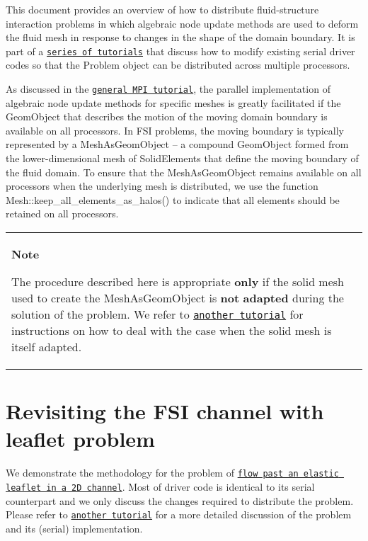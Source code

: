 This document provides an overview of how to distribute fluid-\/structure interaction problems in which algebraic node update methods are used to deform the fluid mesh in response to changes in the shape of the domain boundary. It is part of a \href{../../../example_code_list/html/index.html#distributed}{\tt series of tutorials} that discuss how to modify existing serial driver codes so that the {\ttfamily Problem} object can be distributed across multiple processors.

As discussed in the \href{../../general_mpi/html/index.html#alg_node_update}{\tt general M\+PI tutorial}, the parallel implementation of algebraic node update methods for specific meshes is greatly facilitated if the {\ttfamily Geom\+Object} that describes the motion of the moving domain boundary is available on all processors. In F\+SI problems, the moving boundary is typically represented by a {\ttfamily Mesh\+As\+Geom\+Object} -- a compound {\ttfamily Geom\+Object} formed from the lower-\/dimensional mesh of {\ttfamily Solid\+Elements} that define the moving boundary of the fluid domain. To ensure that the {\ttfamily Mesh\+As\+Geom\+Object} remains available on all processors when the underlying mesh is distributed, we use the function {\ttfamily Mesh\+::keep\+\_\+all\+\_\+elements\+\_\+as\+\_\+halos()} to indicate that all elements should be retained on all processors.

\begin{center} \tabulinesep=1mm
\begin{longtabu} spread 0pt [c]{*{1}{|X[-1]}|}
\hline
\begin{center} {\bfseries Note} \end{center}  The procedure described here is appropriate {\bfseries only} if the solid mesh used to create the {\ttfamily Mesh\+As\+Geom\+Object} is {\bfseries not} {\bfseries adapted} during the solution of the problem. We refer to \href{../../turek_flag/html/index.html}{\tt another tutorial} for instructions on how to deal with the case when the solid mesh is itself adapted.   \\
\end{longtabu}
\end{center} 



\hypertarget{index_fsi_channel_with_leaflet}{}\section{Revisiting the F\+S\+I channel with leaflet problem}\label{index_fsi_channel_with_leaflet}
We demonstrate the methodology for the problem of \href{../../../interaction/fsi_channel_with_leaflet/html/index.html}{\tt flow past an elastic leaflet in a 2D channel}. Most of driver code is identical to its serial counterpart and we only discuss the changes required to distribute the problem. Please refer to \href{../../../interaction/fsi_channel_with_leaflet/html/index.html}{\tt another tutorial} for a more detailed discussion of the problem and its (serial) implementation.



